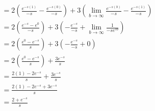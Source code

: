 \documentclass[exam=2]{math252exam}
\begin{document}
\begin{problems}
{\begin{equation*}
\begin{aligned}
							&= 2\left( \frac{e^{-s(1)}}{-s} - \frac{e^{-s(0)}}{-s} \right) + 3\left( \lim_{b\rightarrow\infty}\frac{e^{-s(b)}}{-s} - \frac{e^{-s(1)}}{-s} \right)\\
							&= 2\left( \frac{e^{-s} - e^{0}}{-s} \right) + 3\left( - \frac{e^{-s}}{-s} + \lim_{b\rightarrow\infty}\frac{1}{-se^{sb}} \right)\\
							&= 2\left( \frac{e^{0} - e^{-s}}{s} \right) + 3\left( - \frac{e^{-s}}{-s} + 0\right)\\
							&= 2\left( \frac{e^{0} - e^{-s}}{s} \right) + \frac{3e^{-s}}{s}\\
							&= \frac{2(1) - 2e^{-s}}{s} + \frac{3e^{-s}}{s}\\
							&= \frac{2(1) - 2e^{-s} + 3e^{-s}}{s}\\
							&= \frac{2 + e^{-s}}{s}\\
	\end{aligned}
	\end{equation*}}
\end{problems}
\end{document}
